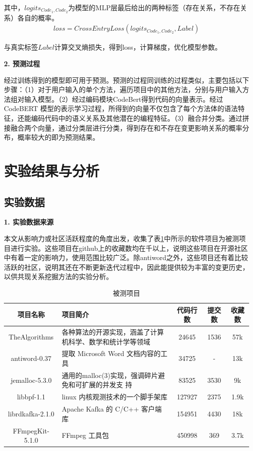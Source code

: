 其中，$logits_{Code_1,Code_2}$为模型的MLP层最后给出的两种标签（存在关系，不存在关系）各自的概率。
\begin{align}
loss=CrossEntryLoss(logits_{Code_1,Code_2}, Label)
\end{align}

与真实标签$Label$计算交叉熵损失，得到loss，计算梯度，优化模型参数。

\noindent \textbf{2. 预测过程}

经过训练得到的模型即可用于预测。预测的过程同训练的过程类似，主要包括以下步骤：（1）对于用户输入的单个方法，遍历项目中的其他方法，分别与用户输入方法组对输入模型。（2）经过编码模块CodeBert得到代码的向量表示。经过 CodeBERT 模型的表示学习过程，所得到的向量不仅包含了每个方法体的语法特征，还能编码代码中的语义关系及其他潜在的编程特征。（3）融合并分类。通过拼接融合两个向量，通过分类层进行分类，得到存在和不存在变更影响关系的概率分布，概率较大的即为预测结果。


\section{实验结果与分析}

\subsection{实验数据}

\noindent \textbf{1. 实验数据来源}

本文从影响力或社区活跃程度的角度出发，收集了表\ref{1_data_from}中所示的软件项目为被测项目进行实验。这些项目在github上的收藏数均在千以上，说明这些项目在开源社区中有着一定的影响力，使用范围比较广泛。除antiword之外，这些项目还有着比较活跃的社区，说明其还在不断更新迭代过程中，因此能提供较为丰富的变更历史，以供共现关系挖掘方法的实验分析。

\begin{table}[htbp]
\caption{被测项目}
\label{1_data_from}
\vspace{0.5em}\centering\wuhao
\begin{tabular}{cp{6cm}ccc}
\toprule
项目名称 & 项目简介 & 代码行数& 提交数 & 收藏数 \\
\midrule
TheAlgorithms & 各种算法的开源实现，涵盖了计算机科学、数学和统计学等领域 & 24645 & 1536 & 57k \\
antiword-0.37 & 提取 Microsoft Word 文档内容的工具 & 34725& - & 13k\\
jemalloc-5.3.0 & 通用的malloc(3)实现，强调碎片避免和可扩展的并发支
持  &83525& 3530 & 9k \\
libbpf-1.1 & linux 内核观测技术的一个脚手架库 & 127927 & 2375 & 1.9k \\
librdkafka-2.1.0& Apache Kafka 的 C/C++ 客户端库 & 154951 & 4430 & 18k \\
FFmpegKit-5.1.0 & FFmpeg 工具包 & 450998 & 369 & 3.7k \\

\bottomrule
\end{tabular}
\end{table}

